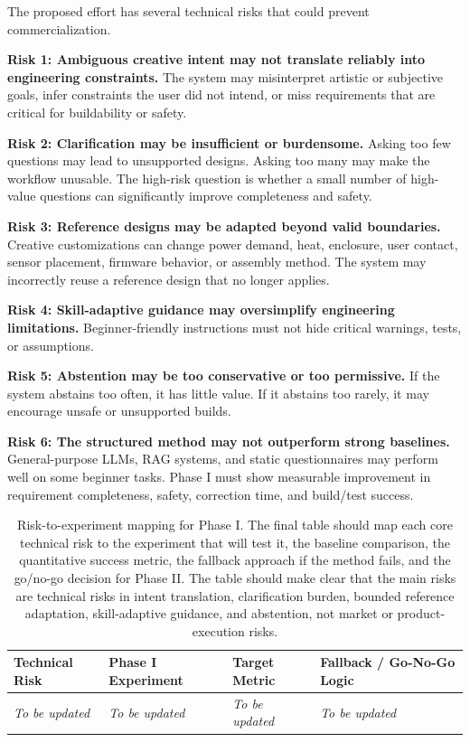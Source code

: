 The proposed effort has several technical risks that could prevent commercialization.

\textbf{Risk 1: Ambiguous creative intent may not translate reliably into engineering constraints.} The system may misinterpret artistic or subjective goals, infer constraints the user did not intend, or miss requirements that are critical for buildability or safety.

\textbf{Risk 2: Clarification may be insufficient or burdensome.} Asking too few questions may lead to unsupported designs. Asking too many may make the workflow unusable. The high-risk question is whether a small number of high-value questions can significantly improve completeness and safety.

\textbf{Risk 3: Reference designs may be adapted beyond valid boundaries.} Creative customizations can change power demand, heat, enclosure, user contact, sensor placement, firmware behavior, or assembly method. The system may incorrectly reuse a reference design that no longer applies.

\textbf{Risk 4: Skill-adaptive guidance may oversimplify engineering limitations.} Beginner-friendly instructions must not hide critical warnings, tests, or assumptions.

\textbf{Risk 5: Abstention may be too conservative or too permissive.} If the system abstains too often, it has little value. If it abstains too rarely, it may encourage unsafe or unsupported builds.

\textbf{Risk 6: The structured method may not outperform strong baselines.} General-purpose LLMs, RAG systems, and static questionnaires may perform well on some beginner tasks. Phase I must show measurable improvement in requirement completeness, safety, correction time, and build/test success.

\begin{table}[H]
\centering
\caption{Risk-to-experiment mapping for Phase I. The final table should map each core technical risk to the experiment that will test it, the baseline comparison, the quantitative success metric, the fallback approach if the method fails, and the go/no-go decision for Phase II. The table should make clear that the main risks are technical risks in intent translation, clarification burden, bounded reference adaptation, skill-adaptive guidance, and abstention, not market or product-execution risks.}
\label{tab:risk_experiment_mapping}
\renewcommand{\arraystretch}{1.12}
\small
\begin{tabular}{p{} p{} p{} p{}}
\hline
\textbf{Technical Risk} & \textbf{Phase I Experiment} & \textbf{Target Metric} & \textbf{Fallback / Go-No-Go Logic} \\
\hline
\textit{To be updated} & \textit{To be updated} & \textit{To be updated} & \textit{To be updated} \\
\hline
\end{tabular}
\end{table}

